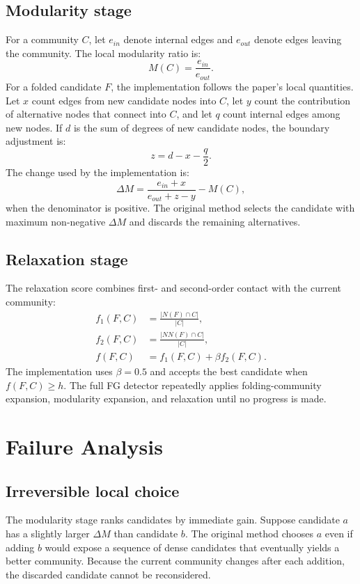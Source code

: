 \documentclass[10pt,journal,compsoc]{IEEEtran}
\begin{document}
\subsection{Modularity stage}
For a community $C$, let $e_{in}$ denote internal edges and $e_{out}$ denote
edges leaving the community. The local modularity ratio is:
\begin{equation}
 M(C)=\frac{e_{in}}{e_{out}}.
\end{equation}
For a folded candidate $F$, the implementation follows the paper's local
quantities. Let $x$ count edges from new candidate nodes into $C$, let $y$
count the contribution of alternative nodes that connect into $C$, and let
$q$ count internal edges among new nodes. If $d$ is the sum of degrees of new
candidate nodes, the boundary adjustment is:
\begin{equation}
 z=d-x-\frac{q}{2}.
\end{equation}
The change used by the implementation is:
\begin{equation}
 \Delta M = \frac{e_{in}+x}{e_{out}+z-y}-M(C),
\end{equation}
when the denominator is positive. The original method selects the candidate
with maximum non-negative $\Delta M$ and discards the remaining alternatives.

\subsection{Relaxation stage}
The relaxation score combines first- and second-order contact with the current
community:
\begin{align}
 f_1(F,C)&=\frac{|N(F)\cap C|}{|C|},\\
 f_2(F,C)&=\frac{|NN(F)\cap C|}{|C|},\\
 f(F,C)&=f_1(F,C)+\beta f_2(F,C).
\end{align}
The implementation uses $\beta=0.5$ and accepts the best candidate when
$f(F,C)\geq h$. The full FG detector repeatedly applies folding-community
expansion, modularity expansion, and relaxation until no progress is made.

\section{Failure Analysis}
\subsection{Irreversible local choice}
The modularity stage ranks candidates by immediate gain. Suppose candidate
$a$ has a slightly larger $\Delta M$ than candidate $b$. The original method
chooses $a$ even if adding $b$ would expose a sequence of dense candidates that
eventually yields a better community. Because the current community changes
after each addition, the discarded candidate cannot be reconsidered.
\end{document}
